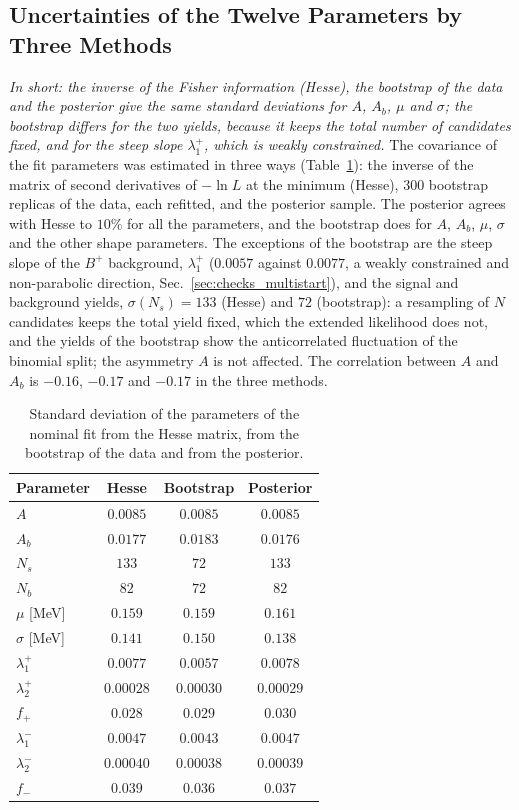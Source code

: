 \subsection{Uncertainties of the Twelve Parameters by Three Methods}
\label{sec:checks_covariance}
\emph{In short: the inverse of the Fisher information (Hesse), the bootstrap of the data and the posterior give the same standard deviations for $A$, $A_b$, $\mu$ and $\sigma$; the bootstrap differs for the two yields, because it keeps the total number of candidates fixed, and for the steep slope $\lambda_1^+$, which is weakly constrained.}
The covariance of the fit parameters was estimated in three ways (Table~\ref{tab:checks_covariance}): the inverse of the matrix of second derivatives of $-\ln L$ at the minimum (Hesse), $300$ bootstrap replicas of the data, each refitted, and the posterior sample. The posterior agrees with Hesse to $10\%$ for all the parameters, and the bootstrap does for $A$, $A_b$, $\mu$, $\sigma$ and the other shape parameters. The exceptions of the bootstrap are the steep slope of the $B^+$ background, $\lambda_1^+$ ($0.0057$ against $0.0077$, a weakly constrained and non-parabolic direction, Sec.~\ref{sec:checks_multistart}), and the signal and background yields, $\sigma(N_s)=133$ (Hesse) and $72$ (bootstrap): a resampling of $N$ candidates keeps the total yield fixed, which the extended likelihood does not, and the yields of the bootstrap show the anticorrelated fluctuation of the binomial split; the asymmetry $A$ is not affected. The correlation between $A$ and $A_b$ is $-0.16$, $-0.17$ and $-0.17$ in the three methods.

\begin{table}[h]
\centering
\begin{tabular}{lccc}
\toprule
Parameter & Hesse & Bootstrap & Posterior \\
\midrule
$A$ & $0.0085$ & $0.0085$ & $0.0085$ \\
$A_b$ & $0.0177$ & $0.0183$ & $0.0176$ \\
$N_s$ & $133$ & $72$ & $133$ \\
$N_b$ & $82$ & $72$ & $82$ \\
$\mu$ [MeV] & $0.159$ & $0.159$ & $0.161$ \\
$\sigma$ [MeV] & $0.141$ & $0.150$ & $0.138$ \\
$\lambda_1^+$ & $0.0077$ & $0.0057$ & $0.0078$ \\
$\lambda_2^+$ & $0.00028$ & $0.00030$ & $0.00029$ \\
$f_+$ & $0.028$ & $0.029$ & $0.030$ \\
$\lambda_1^-$ & $0.0047$ & $0.0043$ & $0.0047$ \\
$\lambda_2^-$ & $0.00040$ & $0.00038$ & $0.00039$ \\
$f_-$ & $0.039$ & $0.036$ & $0.037$ \\
\bottomrule
\end{tabular}
\caption{Standard deviation of the parameters of the nominal fit from the Hesse matrix, from the bootstrap of the data and from the posterior.}
\label{tab:checks_covariance}
\end{table}

